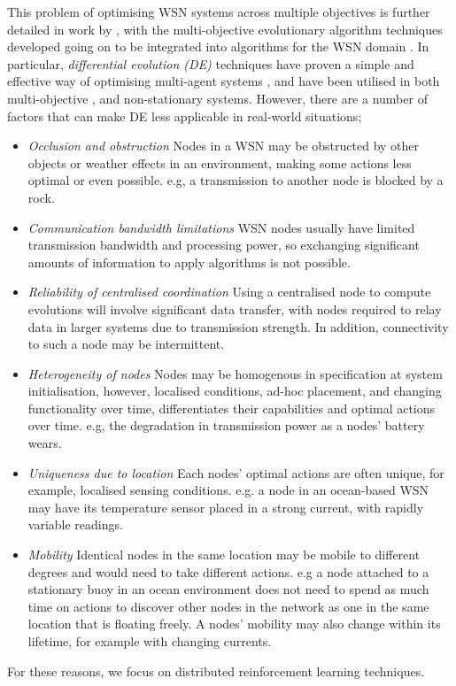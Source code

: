 This problem of optimising WSN systems across multiple objectives is further detailed in work by \cite{ s150717572}, with the multi-objective evolutionary algorithm techniques developed going on to be integrated into algorithms for the WSN domain \citep{4633340,SENGUPTA2013405}. In particular, \textit{differential evolution (DE)} \cite{XXX} techniques have proven a simple and effective way of optimising multi-agent systems \cite{XXX}, and have been utilised in both multi-objective \cite{XXX}, and non-stationary \cite{XXX} systems. However, there are a number of factors that can make DE less applicable in real-world situations;
\begin{itemize}
	\item \textit{Occlusion and obstruction} Nodes in a WSN may be obstructed by other objects or weather effects in an environment, making some actions less optimal or even possible. e.g, a transmission to another node is blocked by a rock.

	\item \textit{Communication bandwidth limitations} WSN nodes usually have limited transmission bandwidth and processing power, so exchanging significant amounts of information to apply algorithms is not possible. 
	
	\item \textit{Reliability of centralised coordination} Using a centralised node to compute evolutions will involve significant data transfer, with nodes required to relay data in larger systems due to transmission strength. In addition, connectivity to such a node may be intermittent. 
	
	\item \textit{Heterogeneity of nodes} Nodes may be homogenous in specification at system initialisation, however, localised conditions, ad-hoc placement, and changing functionality over time, differentiates their capabilities and optimal actions over time. e.g, the degradation in transmission power as a nodes' battery wears.
	
	\item \textit{Uniqueness due to location} Each nodes' optimal actions are often unique, for example, localised sensing conditions. e.g. a node in an ocean-based WSN may have its temperature sensor placed in a strong current, with rapidly variable readings.
	
	\item \textit{Mobility} Identical nodes in the same location may be mobile to different degrees and would need to take different actions. e.g a node attached to a stationary buoy in an ocean environment does not need to spend as much time on actions to discover other nodes in the network as one in the same location that is floating freely. A nodes' mobility may also change within its lifetime, for example with changing currents.
\end{itemize}
For these reasons, we focus on distributed reinforcement learning techniques.

